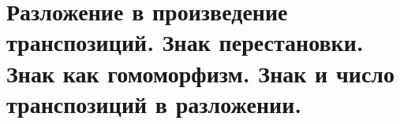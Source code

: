 \documentclass[11pt,dvipsnames]{report}
\begin{document}
\section{Разложение в произведение транспозиций. Знак перестановки. Знак как гомоморфизм. Знак и число транспозиций в разложении.}
\end{document}
